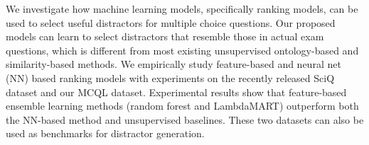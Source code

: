 We investigate how machine learning models, specifically ranking models, can be used to select useful distractors for multiple choice questions. Our proposed models can learn to select distractors that resemble those in actual exam questions, which is different from most existing unsupervised ontology-based and similarity-based methods. We empirically study feature-based and neural net (NN) based ranking models with experiments on the recently released SciQ dataset and our MCQL dataset. Experimental results show that feature-based ensemble learning methods (random forest and LambdaMART) outperform both the NN-based method and unsupervised baselines. These two datasets can also be used as benchmarks for distractor generation.
